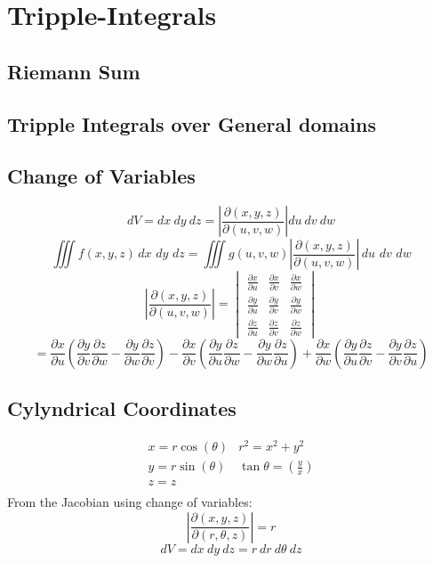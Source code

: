 \section{Tripple-Integrals}
\subsection{Riemann Sum}
\subsection{Tripple Integrals over General domains}
\subsection{Change of Variables}
$$dV=dx\ dy\ dz= \left|\frac{\partial (x,y,z)}{\partial (u,v,w)}\right|du\ dv\ dw$$
$$\iiint f(x,y,z)\,d x\,\,d y\,\,d z=\iiint g(u,v,w)\left|{\frac{\partial(x,y,z)}{\partial(u,v,w)}}\right|\,d u\,\,d v\,\,d w$$
$$\left|\frac{\partial(x,y,z)}{\partial(u,v,w)}\right|=
\begin{vmatrix}
  \frac{\partial x}{\partial u}&\frac{\partial x}{\partial v}&\frac{\partial x}{\partial w}\\
  \frac{\partial y}{\partial u}&\frac{\partial y}{\partial v}&\frac{\partial y}{\partial w}\\
  \frac{\partial z}{\partial u}&\frac{\partial z}{\partial v}&\frac{\partial z}{\partial w}
\end{vmatrix}$$
$$=\frac{\partial x}{\partial u}\left( \frac{\partial y}{\partial v}\frac{\partial z}{\partial w}-\frac{\partial y}{\partial w}\frac{\partial z}{\partial v}\right)
-\frac{\partial x}{\partial v}\left(\frac{\partial y}{\partial u}\frac{\partial z}{\partial w}-\frac{\partial y}{\partial w}\frac{\partial z}{\partial u}\right)
+\frac{\partial x}{\partial w}\left(\frac{\partial y}{\partial u}\frac{\partial z}{\partial v}-\frac{\partial y}{\partial v}\frac{\partial z}{\partial u}\right)$$
\subsection{Cylyndrical Coordinates}
$$\begin{array}{ll}
  x=r\cos(\theta)&r^2=x^2+y^2\\
  y=r\sin(\theta)&\tan\theta=(\frac{y}{x})\\
  z=z\\
\end{array}$$
From the Jacobian using change of variables:
$$\left|\frac{\partial(x,y,z)}{\partial(r,\theta,z)}\right|=r$$
$$dV=dx\ dy\ dz= r\ dr\ d\theta\ dz$$
